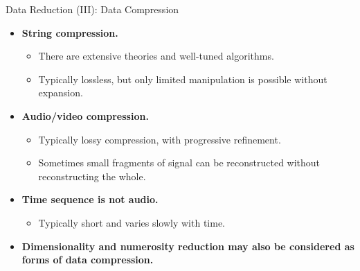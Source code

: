 \begin{frame}{Data Reduction (III): Data Compression}
	\begin{itemize}
		\item \textbf{String compression.}
		      \begin{itemize}
			      \item There are extensive theories and well-tuned algorithms.
			      \item Typically lossless, but only limited manipulation is possible
			            without expansion.
		      \end{itemize}
		\item \textbf{Audio/video compression.}
		      \begin{itemize}
			      \item Typically lossy compression, with progressive refinement.
			      \item Sometimes small fragments of signal can be reconstructed
			            without reconstructing the whole.
		      \end{itemize}
		\item \textbf{Time sequence is not audio.}
		      \begin{itemize}
			      \item Typically short and varies slowly with time.
		      \end{itemize}
		\item \textbf{Dimensionality and numerosity reduction may also be
			      considered as forms of data compression.}
	\end{itemize}
\end{frame}
